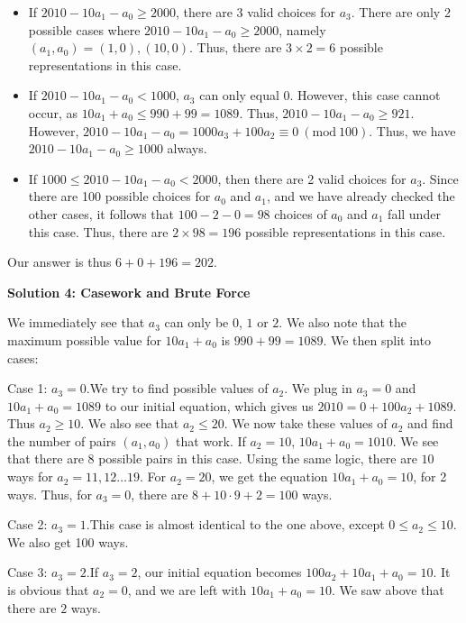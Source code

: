 \begin{enumerate}
 
            \begin{itemize}
        \item If $2010 - 10a_1 - a_0 \geq 2000$, there are 3 valid choices for $a_3$. There are only 2 possible cases where $2010 - 10a_1 - a_0 \geq 2000$, namely $(a_1, a_0) = (1,0), (10,0)$. Thus, there are $3 \times 2 = 6$ possible representations in this case.
        \item If $2010 - 10a_1 - a_0 < 1000$, $a_3$ can only equal 0. However, this case cannot occur, as $10a_1+a_0\leq 990+99 = 1089$. Thus, $2010-10a_1-a_0 \geq 921$. However,  $2010-10a_1-a_0 = 1000a_3 + 100a_2 \equiv 0\  (\textrm{mod}\ 100)$. Thus, we have $2010-10a_1-a_0 \geq 1000$ always.
        \item If $1000 \leq 2010 - 10a_1 - a_0 < 2000$, then there are 2 valid choices for $a_3$. Since there are 100 possible choices for $a_0$ and $a_1$, and we have already checked the other cases, it follows that $100 - 2 - 0 = 98$ choices of $a_0$ and $a_1$ fall under this case. Thus, there are $2 \times 98 = 196$ possible representations in this case.
            \end{itemize}
            Our answer is thus $6 + 0 + 196 = \boxed{202}$.

 



\textbf{Solution 4: Casework and Brute Force}

We immediately see that $a_3$ can only be $0$, $1$ or $2$. We also note that the maximum possible value for $10a_1 + a_0$ is $990 + 99 = 1089$. We then split into cases:

 Case 1: $a_3 = 0$.We try to find possible values of $a_2$. We plug in $a_3 = 0$ and $10a_1 + a_0 = 1089$ to our initial equation, which gives us $2010 = 0 + 100a_2 + 1089$. Thus $a_2 \geq 10$. We also see that $a_2 \leq 20$. We now take these values of $a_2$ and find the number of pairs $(a_1, a_0)$ that work. If $a_2 = 10$, $10a_1 + a_0 = 1010$. We see that there are $8$ possible pairs in this case. Using the same logic, there are $10$ ways for $a_2 = 11, 12 \ldots 19$. For $a_2 = 20$, we get the equation $10a_1 + a_0 = 10$, for 2 ways. Thus, for $a_3 = 0$, there are $8 + 10 \cdot 9 + 2 = 100$ ways.

 Case 2: $a_3 = 1$.This case is almost identical to the one above, except $0 \leq a_2 \leq 10$. We also get 100 ways.

 Case 3: $a_3 = 2$.If $a_3 = 2$, our initial equation becomes $100a_2 + 10a_1 + a_0 = 10$. It is obvious that $a_2 = 0$, and we are left with $10a_1 + a_0 = 10$. We saw above that there are $2$ ways.


\end{enumerate}
